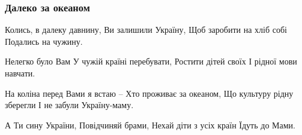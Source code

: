  
 
 

\subsubsection{Далеко за океаном}

Колись, в далеку давнину,
Ви залишили Україну,
Щоб заробити на хліб собі
Подались на чужину.

Нелегко було Вам
У чужій країні перебувати,
Ростити дітей своїх
І рідної мови навчати.

На коліна перед Вами я встаю –
Хто проживає за океаном,
Що культуру рідну зберегли
І не забули Україну-маму.

А Ти сину України,
Повідчиняй брами,
Нехай діти з усіх країн
Їдуть до Мами. 

